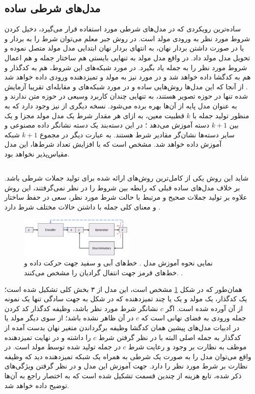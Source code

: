 \subsection{مدل‌های شرطی ساده}
ساده‌ترین رویکردی که در مدل‌های شرطی مورد استفاده قرار می‌گیرد، دخیل کردن شروط مورد نظر به ورودی مولد است. در روش جبر معلم می‌توان شرط را به بردار  و  یا در صورت داشتن بردار نهان، به انتهای بردار نهان ابتدایی مدل مولد متصل نموده و تحویل مدل مولد داد. در واقع مدل مولد به تنهایی بایستی هم ساختار جمله و هم اعمال شروط مورد نظر را به جمله یاد بگیرد. در مورد شبکه‌های \vae{} این شروط، هم به کدگذار و هم به کدگشا داده خواهد شد \cite{cvae} و در مورد\gan{} نیز به مولد و تمیزدهنده ورودی داده خواهد شد \cite{cgan}. از آنجا که این مدل‌ها روش‌هایی ساده و در مورد شبکه‌های \vae{} و مقابله‌ای تقریبا آزمایش شده تنها در حوزه تصویر هستند، به تنهایی چندان کاربرد وسیعی در حوزه متن ندارند و به عنوان مدل پایه از آن‌ها بهره برده ‌می‌شود. نسخه دیگری از \gan{} نیز وجود دارد که به منظور تولید جمله با $k$ قطبیت معین، به ازای هر مقدار شرط یک مدل مولد مجزا و یک  بین $k+1$ دسته آموزش می‌دهد \cite{sentigan}؛ در این دسته‌بند یک دسته نشانگر داده مصنوعی و سایر دسته‌ها نشان‌گر مقادیر شرط هستند. به عبارت دیگر در مجموع $k+1$ شبکه آموزش داده خواهد شد. مشخص است که با افزایش تعداد شرط‌ها، این مدل مقیاس‌پذیر نخواهد بود.
\subsection{\towardctg}
شاید این روش یکی از کامل‌ترین روش‌های ارائه شده برای تولید جملات شرطی باشد. بر خلاف مدل‌های ساده قبلی که رابطه بین شروط را در نظر نمی‌گرفتند، این روش علاوه بر تولید جملات صحیح و مرتبط با حالت شرط مورد نظر، سعی در حفظ ساختار و معنای کلی جمله با داشتن حالات مختلف شرط دارد \cite{toward}.
\begin{figure}[h]
	\centering
	\includegraphics[width=0.5\textwidth]{images/toward1.png}
	\caption{
		نمایی نحوه آموزش مدل \towardctg. خط‌های آبی و سفید جهت حرکت داده و خط‌های قرمز جهت انتفال گرادیان را مشخص می‌کنند.
		\cite{toward}.}
	\label{fig:toward}
\end{figure}
همان‌طور که در شکل \ref{fig:toward} مشخص است، این مدل از ۳ بخش کلی تشکیل شده است؛ یک کدگذار، یک مولد و یک یا چند تمیزدهنده که در شکل به جهت سادگی تنها یک نمونه از آن آورده شده است. اگر $c$ نشانگر شرط مورد نظر باشد، وظیفه کدگذار کد کردن جمله ورودی به فضای نهانی است که $c$ در آن ظاهر نشده باشد؛ از سوی دیگر مولد یا در ادبیات مدل‌های پیشین همان کدگشا وظیفه برگرداندن متغیر نهان بدست آمده از کدگذار به جمله اصلی البته با در نظر گرفتن شرط $c$ را داشته و در نهایت تمیزدهنده موظف به نظارت بر وجود و رعایت شرط $c$ در جمله تولید شده توسط مولد است. در واقع می‌توان مدل را به صورت یک \vae{} شرطی به همراه یک شبکه تمیزدهنده دید که وظیفه نظارت بر شرط مورد نظر را دارد. جهت آموزش این مدل و در نظر گرفتن ویژگی‌های ذکر شده، تابع هزینه از چندین قسمت تشکیل شده است که به اختصار راجع به آن‌ها توضیح داده خواهد شد.\\

